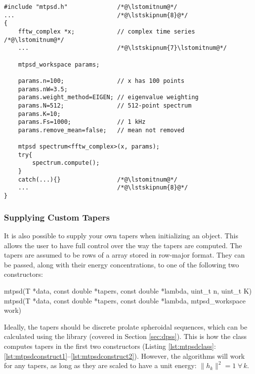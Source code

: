 \begin{lstlisting}[label=lst:workexample,caption=Example using the \texttt{mtpsd\_workspace} ]
#include "mtpsd.h"              /*@\lstomitnum@*/
...                             /*@\lstskipnum{8}@*/
{
    fftw_complex *x;            // complex time series /*@\lstomitnum@*/
    ...                         /*@\lstskipnum{7}\lstomitnum@*/

    mtpsd_workspace params;

    params.n=100;               // x has 100 points
    params.nW=3.5;
    params.weight_method=EIGEN; // eigenvalue weighting
    params.N=512;               // 512-point spectrum
    params.K=10;                
    params.Fs=1000;             // 1 kHz
    params.remove_mean=false;   // mean not removed

    mtpsd spectrum<fftw_complex>(x, params);
    try{
        spectrum.compute();
    }
    catch(...){}                /*@\lstomitnum@*/
    ...                         /*@\lstskipnum{8}@*/
}
\end{lstlisting}

\subsubsection{Supplying Custom Tapers}

It is also possible to supply your own tapers when initializing an  object.  This allows the user to have full control over the way the tapers are computed.  The tapers are assumed to be rows of a  array stored in row-major format.  They can be passed, along with their energy concentrations, to one of the following two constructors:
\smallskip

\begin{lstplainblock}
mtpsd(T *data, const double *tapers, const double *lambda, uint_t n, uint_t K)
mtpsd(T *data, const double *tapers, const double *lambda, mtpsd_workspace work)
\end{lstplainblock}
\smallskip

\noindent Ideally, the tapers should be discrete prolate spheroidal sequences, which can be calculated using the  library (covered in Section \ref{sec:dpss}).  This is how the  class computes tapers in the first two constructors (Listing \ref{lst:mtpsdclass}:\ref{lst:mtpsdconstruct1}--\ref{lst:mtpsdconstruct2}).  However, the algorithms will work for any tapers, as long as they are scaled to have a unit energy:
$\|h_k\|^2 = 1\; \forall\, k$.  

